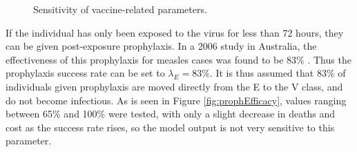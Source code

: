 \begin{figure}[ht!]{\textwidth}
    \centering
     \vspace{2pt}
\caption{Sensitivity of vaccine-related parameters.}
\end{figure}

If the individual has only been exposed to the virus for less than 72 hours, they can be given post-exposure prophylaxis. In a 2006 study in Australia, the effectiveness of this prophylaxis for measles cases was found to be 83\% \cite{csiro_2009}. Thus the prophylaxis success rate can be set to $\lambda_{E} = 83\%$. It is thus assumed that 83\% of individuals given prophylaxis are moved directly from the E to the V class, and do not become infectious. As is seen in Figure \ref{fig:prophEfficacy}, values ranging between 65\% and 100\% were tested, with only a slight decrease in deaths and cost as the success rate rises, so the model output is not very sensitive to this parameter.

